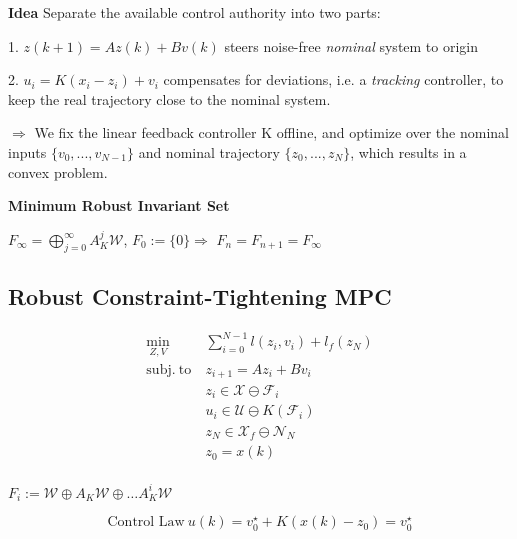 \textbf{Idea}
Separate the available control authority into two parts:

1.
$z(k+1)=Az(k)+Bv(k)$
steers
noise-free \textit{nominal} system
to origin

2.
$u_i=K(x_i-z_i)+v_i$
compensates for deviations,
i.e. a \textit{tracking} controller,
to keep the real trajectory
close to the nominal system.

$\Rightarrow$
We fix the linear feedback controller K offline,
and optimize over the nominal inputs $\{v_0,...,v_{N−1}\}$
and nominal trajectory $\{z_0,...,z_N\}$,
which results in a convex problem.


\textbf{Minimum Robust Invariant Set}

$F_\infty = \bigoplus_{j=0}^\infty A_K^j \mathcal{W}$,
$F_0 := \{0\}\Rightarrow$
$F_n = F_{n+1} = F_\infty$%


\begin{sstTitleBox}{\subsection{Robust Constraint-Tightening MPC}}

	\[\begin{aligned}
			\min_{Z,V} \         & \sum_{i=0}^{N-1} l(z_i, v_i) + l_f(z_N)      \\
			\mathrm{subj.\ to}\  & z_{i+1} = Az_i + Bv_i                        \\
			                     & z_i \in \mathcal{X} \ominus \mathcal{F}_i    \\
			                     & u_i \in \mathcal{U} \ominus K(\mathcal{F}_i) \\
			                     & z_N \in \mathcal{X}_f \ominus \mathcal{N}_N  \\
			                     & z_0 = x(k)                                   \\
		\end{aligned}\]

	$F_i := \mathcal{W} \oplus A_K\mathcal{W} \oplus \dots A_K^{i}\mathcal{W}$

	$$\text{Control\ Law}\   u(k) = v_0^\star + K(x(k)-z_0) = v_0^\star$$

\end{sstTitleBox}

